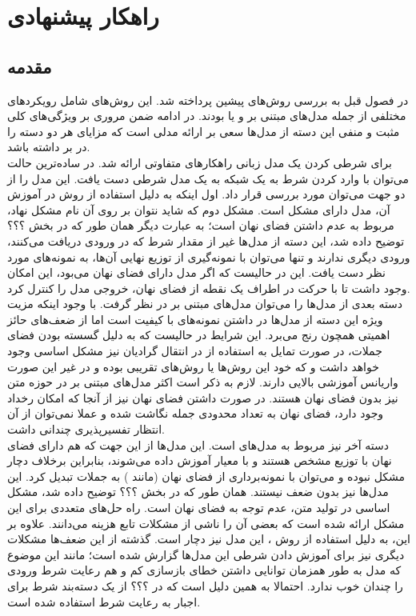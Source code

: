 \chapter{راهکار پیشنهادی}\label{chap3}
\minitoc

\section{مقدمه}
در فصول قبل به بررسی روش‌های پیشین پرداخته شد. این روش‌های شامل رویکرد‌های مختلفی از جمله مدل‌های مبتنی بر \gan{} و یا \vae{} بودند. در ادامه ضمن مروری بر ویژگی‌های کلی مثبت و منفی این دسته از مدل‌ها سعی بر ارائه مدلی است که مزایای هر دو دسته را در بر داشته باشد.
\\
برای شرطی کردن یک مدل زبانی راهکارهای متفاوتی ارائه شد. در ساده‌ترین حالت می‌توان با وارد کردن شرط به یک شبکه  به یک مدل شرطی دست یافت. این مدل را از دو جهت می‌توان مورد بررسی قرار داد. اول اینکه به دلیل استفاده از روش \teacherforcing{} در آموزش آن، مدل دارای مشکل \expbias{} است. مشکل دوم که شاید نتوان بر روی آن نام مشکل نهاد، مربوط به عدم داشتن فضای نهان است؛ به عبارت دیگر همان طور که در بخش ؟؟؟ توضیح داده شد، این دسته از مدل‌ها غیر از مقدار شرط که در ورودی دریافت می‌کنند، ورودی دیگری ندارند و تنها می‌توان با نمونه‌گیری از توزیع نهایی آن‌ها، به نمونه‌های مورد نظر دست یافت. این در حالیست که اگر مدل دارای فضای نهان می‌بود، این امکان وجود داشت تا با حرکت در اطراف یک نقطه از فضای نهان، خروجی مدل را کنترل کرد.
\\
دسته بعدی از مدل‌ها را می‌توان مدل‌های مبتنی بر \gan{} در نظر گرفت. با وجود اینکه مزیت ویژه این دسته از مدل‌ها در داشتن  نمونه‌های با کیفیت است اما از ضعف‌های حائز اهمیتی همچون \modecollapse{} رنج می‌برد. این شرایط در حالیست که به دلیل گسسته بودن فضای جملات، در صورت تمایل به استفاده از \gan{} در انتقال گرادیان نیز مشکل اساسی وجود خواهد داشت و که خود این روش‌ها یا روش‌های تقریبی بوده و در غیر این صورت واریانس آموزشی بالایی دارند. لازم به ذکر است اکثر مدل‌های مبتنی بر \gan{} در حوزه متن نیز بدون فضای نهان هستند. در صورت داشتن فضای نهان نیز از آنجا که امکان رخداد \modecollapse{} وجود دارد، فضای نهان به تعداد محدودی جمله نگاشت شده و عملا نمی‌توان از آن انتظار تفسیرپذیری چندانی داشت.
\\
دسته آخر نیز مربوط به مدل‌های \vae{} است. این مدل‌ها از این جهت که هم دارای فضای نهان با توزیع مشخص هستند و با معیار \likelihood{} آموزش داده می‌شوند، بنابراین برخلاف \gan{} دچار مشکل \modecollapse{} نبوده و می‌توان با نمونه‌برداری از فضای نهان (مانند \gan{}) به جملات تبدیل کرد. این مدل‌ها نیز بدون ضعف نیستند. همان طور که در بخش ؟؟؟ توضیح داده شد، مشکل اساسی \vae{} در تولید متن، عدم توجه به فضای نهان است. راه حل‌های متعددی برای این مشکل ارائه شده است که بعضی آن را ناشی از مشکلات تابع هزینه می‌دانند. علاوه بر این، به دلیل استفاده از روش ‌\teacherforcing{}، این مدل نیز دچار \expbias{} است. گذشته از این ضعف‌ها مشکلات دیگری نیز برای آموزش دادن شرطی این مدل‌ها گزارش شده است؛ مانند این موضوع که مدل به طور همزمان توانایی داشتن خطای بازسازی کم و هم رعایت شرط ورودی را چندان خوب ندارد. احتمالا به همین دلیل است که در ؟؟؟ از یک دسته‌بند شرط برای اجبار \decoder{} به رعایت شرط استفاده شده است.

